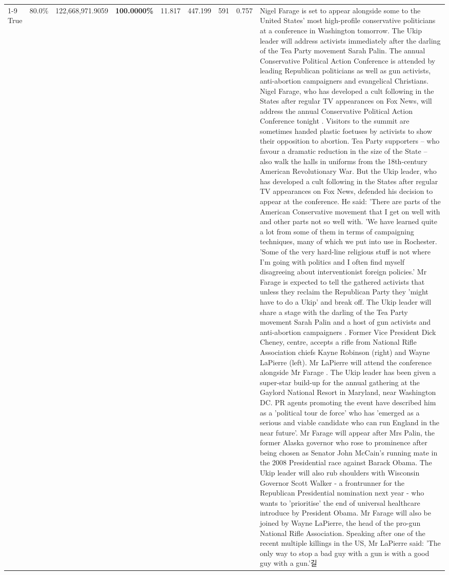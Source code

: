 \begin{table}[H]
\begin{tabular}{lllrlllll}
\cline{1-9}
True & 80.0\% & 122,668,971.9059 & \bfseries \color{red} 100.0000\% & 11.817 & 447.199 & 591 & 0.757 & Nigel Farage is set to appear alongside some to the United States' most high-profile conservative politicians at a conference in Washington tomorrow. The Ukip leader will address activists immediately after the darling of the Tea Party movement Sarah Palin. The annual Conservative Political Action Conference is attended by leading Republican politicians as well as gun activists, anti-abortion campaigners and evangelical Christians. Nigel Farage, who has developed a cult following in the States after regular TV appearances on Fox News, will address the annual Conservative Political Action Conference tonight . Visitors to the summit are sometimes handed plastic foetuses by activists to show their opposition to abortion. Tea Party supporters – who favour a dramatic reduction in the size of the State – also walk the halls in uniforms from the 18th-century American Revolutionary War. But the Ukip leader, who has developed a cult following in the States after regular TV appearances on Fox News, defended his decision to appear at the conference. He said: 'There are parts of the American Conservative movement that I get on well with and other parts not so well with. 'We have learned quite a lot from some of them in terms of campaigning techniques, many of which we put into use in Rochester. 'Some of the very hard-line religious stuff is not where I'm going with politics and I often find myself disagreeing about interventionist foreign policies.' Mr Farage is expected to tell the gathered activists that unless they reclaim the Republican Party they 'might have to do a Ukip' and break off. The Ukip leader will share a stage with the darling of the Tea Party movement Sarah Palin and a host of gun activists and anti-abortion campaigners . Former Vice President Dick Cheney, centre, accepts a rifle from National Rifle Association chiefs Kayne Robinson (right) and Wayne LaPierre (left). Mr LaPierre will attend the conference alongside Mr Farage . The Ukip leader has been given a super-star build-up for the annual gathering at the Gaylord National Resort in Maryland, near Washington DC. PR agents promoting the event have described him as a 'political tour de force' who has 'emerged as a serious and viable candidate who can run England in the near future'. Mr Farage will appear after Mrs Palin, the former Alaska governor who rose to prominence after being chosen as Senator John McCain's running mate in the 2008 Presidential race against Barack Obama. The Ukip leader will also rub shoulders with Wisconsin Governor Scott Walker - a frontrunner for the Republican Presidential nomination next year - who wants to 'prioritise' the end of universal healthcare introduce by President Obama. Mr Farage will also be joined by Wayne LaPierre, the head of the pro-gun National Rifle Association. Speaking after one of the recent multiple killings in the US, Mr LaPierre said: 'The only way to stop a bad guy with a gun is with a good guy with a gun.'길 \\

\end{tabular}
\end{table}
